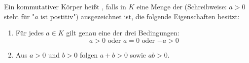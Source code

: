 Ein kommutativer Körper heißt , falls in $K$ eine Menge der  (Schreibweise: $a > 0$ steht für "$a$ ist postitiv") ausgezeichnet ist, die folgende Eigenschaften besitzt:
\begin{enumerate}
    \item Für jedes $a \in K$ gilt genau eine der drei Bedingungen:
    $$\text{$a > 0$ oder $a = 0$ oder $-a > 0$}$$
    \item Aus $a > 0$ und $b > 0$ folgen $a+b > 0$ sowie $ab > 0$.
\end{enumerate}